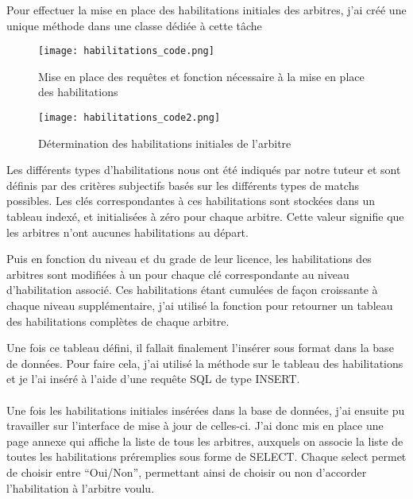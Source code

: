 Pour effectuer la mise en place des habilitations initiales des arbitres, j’ai créé une unique méthode dans une classe dédiée à cette tâche

\newpage

\begin{figure}[!h]
    \centering
    \texttt{[image: habilitations\_code.png]}
    \caption{Mise en place des requêtes et fonction nécessaire à la mise en place des habilitations}
\end{figure}

\begin{figure}[!h]
    \centering
    \texttt{[image: habilitations\_code2.png]}
    \caption{Détermination des habilitations initiales de l'arbitre}
\end{figure}

\newpage 

Les différents types d’habilitations nous ont été indiqués par notre tuteur et sont définis par des critères subjectifs basés sur les différents types de matchs possibles. Les clés correspondantes à ces habilitations sont stockées dans un tableau indexé, et initialisées à zéro pour chaque arbitre. Cette valeur signifie que les arbitres n’ont aucunes habilitations au départ.  

Puis en fonction du niveau et du grade de leur licence, les habilitations des arbitres sont modifiées à un pour chaque clé correspondante au niveau d’habilitation associé. Ces habilitations étant cumulées de façon croissante à chaque niveau supplémentaire, j’ai utilisé la fonction  pour retourner un tableau des habilitations complètes de chaque arbitre.

Une fois ce tableau défini, il fallait finalement l’insérer sous format  dans la base de données. Pour faire cela, j’ai utilisé la méthode  sur le tableau des habilitations et je l’ai inséré à l’aide d’une requête SQL de type INSERT. \\ \\ 

Une fois les habilitations initiales insérées dans la base de données, j’ai ensuite pu travailler sur l’interface de mise à jour de celles-ci. 
J’ai donc mis en place une page annexe qui affiche la liste de tous les arbitres, auxquels on associe la liste de toutes les habilitations préremplies sous forme de SELECT. Chaque select permet de choisir entre “Oui/Non”, permettant ainsi de choisir ou non d’accorder l’habilitation à l’arbitre voulu. 

